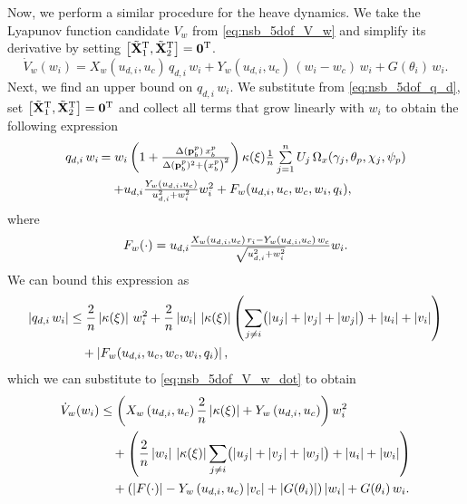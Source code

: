 Now, we perform a similar procedure for the heave dynamics.
We take the Lyapunov function candidate $V_w$ from \eqref{eq:nsb_5dof_V_w} and simplify its derivative by setting $\left[\tilde{\mathbf{X}}_1^{\mathrm{T}}, \tilde{\mathbf{X}}_2^{\mathrm{T}}\right] = \mathbf{0}^{\mathrm{T}}$.
\begin{equation}
    \dot{V}_w(w_i) = X_w\left(u_{d,i}, u_c\right)\,q_{d,i}\,w_i + Y_w\left(u_{d,i}, u_c\right)\,\left(w_i - w_c\right)\,w_i + G(\theta_i)\,w_i. \label{eq:nsb_5dof_V_w_dot}
\end{equation}
Next, we find an upper bound on $q_{d,i}\,w_i$.
We substitute from \eqref{eq:nsb_5dof_q_d}, set $\left[\tilde{\mathbf{X}}_1^{\mathrm{T}}, \tilde{\mathbf{X}}_2^{\mathrm{T}}\right] = \mathbf{0}^{\mathrm{T}}$ and collect all terms that grow linearly with $w_i$ to obtain the following expression
\begin{align}
    \scale[1]{q_{d,i}\,w_i}\, &\scale[1]{= w_i\left(1 + \frac{\Delta(\mat{p}_b^p)\,x_b^p}{\Delta(\mat{p}_b^p)^2 + \left(x_b^p\right)^2}\right) \kappa(\xi) \frac{1}{n} \sum\limits_{j=1}^n U_j\,\Omega_x(\gamma_j, \theta_p, \chi_j, \psi_p)} \\
    & \quad \scale[1]{+ u_{d,i}\frac{Y_w(u_{d,i}, u_c)}{u_{d,i}^2 + w_i^2}w_i^2 + F_w(u_{d,i}, u_c, w_c, w_i, q_i),}
\end{align}
where
\begin{equation}
    \scale[1]{F_w(\cdot) =  u_{d,i}\frac{X_w(u_{d,i}, u_c)\,r_i - Y_w(u_{d,i}, u_c)\,w_c}{\sqrt{u_{d,i}^2 + w_i^2}} w_i.}
\end{equation}
We can bound this expression as
\begin{equation}
    \begin{split}
        \left|q_{d,i}\,w_i\right| &\leq \frac{2}{n}\left|\kappa(\xi)\right|\,w_i^2 + \frac{2}{n}\left|w_i\right|\,\left|\kappa(\xi)\right|\left(\sum_{j \neq i}\bigl(\left|u_j\right| + \left|v_j\right| + \left|w_j\right|\bigr) + \left|u_i\right| + \left|v_i\right|\right) \\
        &\quad + \left|F_w(u_{d,i}, u_c, w_c, w_i, q_i)\right|,
    \end{split}
\end{equation}
which we can substitute to \eqref{eq:nsb_5dof_V_w_dot} to obtain
\begin{equation}
    \begin{split}
        \dot{V}_w(w_i) &\leq \left(X_w\left(u_{d,i}, u_c\right)\frac{2}{n}\left|\kappa(\xi)\right| + Y_w\left(u_{d,i}, u_c\right)\right)w_i^2 \\
        & \quad + \left(\frac{2}{n}\left|w_i\right|\,\left|\kappa(\xi)\right|\sum_{j \neq i}\bigl(\left|u_j\right| + \left|v_j\right| + \left|w_j\right|\bigr) + \left|u_i\right| + \left|w_i\right|\right) \\
        & \quad + \left(\left|F(\cdot)\right| - Y_w\left(u_{d,i}, u_c\right)\left|v_c\right| + \left|G(\theta_i)\right|\right) \left|w_i\right| + G(\theta_i)\,w_i.
    \end{split}
\end{equation}
